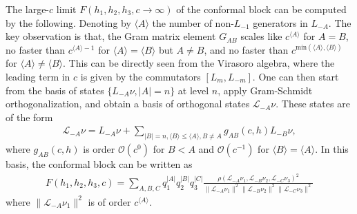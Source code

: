 \documentclass[12pt]{article}
\newcommand{\ie}{\begin{equation}\begin{aligned}}
\newcommand{\fe}{\end{aligned}\end{equation}}
\numberwithin{equation}{section}
\begin{document}
The large-$c$ limit $F(h_1,h_2, h_3,c\rightarrow \infty)$ of the conformal block can be computed by the following. Denoting by $\langle A\rangle$ the number of non-$L_{-1}$ generators in $L_{-A}$. The key observation is that, the Gram matrix element $G_{AB}$ scales like $c^{\langle A\rangle}$ for $A=B$, no faster than $c^{\langle A\rangle-1}$ for $\langle A\rangle = \langle B\rangle$ but $A\neq B$, and no faster than $c^{\text{min}(\langle A\rangle, \langle B\rangle)}$ for $\langle A\rangle \neq \langle B\rangle$. This can be directly seen from the Virasoro algebra, where the leading term in $c$ is given by the commutators $[L_m,L_{-m}]$. One can then start from the basis of states $\{L_{-A}\nu, |A|=n\}$ at level $n$, apply Gram-Schmidt orthogonalization, and obtain a basis of orthogonal states $\mathcal{L}_{-A}\nu$. These states are of the form
\ie 
\mathcal{L}_{-A}\nu = L_{-A}\nu + \sum_{|B|=n, \langle B\rangle \leq \langle A\rangle, B\neq A} g_{AB}(c,h) L_{-B}\nu,
\fe
where $g_{AB}(c,h)$ is order $\mathcal{O}(c^0)$ for $B < A$ and $\mathcal{O}(c^{-1})$ for $\langle B\rangle = \langle A\rangle$. In this basis, the conformal block can be written as
\ie
F(h_1, h_2, h_3, c) = \sum_{A, B, C} q_1^{|A|}q_2^{|B|}q_3^{|C|} \frac{\rho(\mathcal{L}_{-A}\nu_1, \mathcal{L}_{-B}\nu_2, \mathcal{L}_{-C}\nu_3)^2}{\|\mathcal{L}_{-A}\nu_1\|^2\|\mathcal{L}_{-B}\nu_2\|^2\|\mathcal{L}_{-C}\nu_3\|^2}
\fe
where $\|\mathcal{L}_{-A}\nu_1\|^2$ is of order $c^{\langle A\rangle}$.
\end{document}
